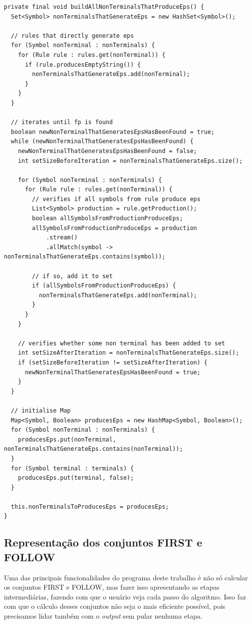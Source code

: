 \documentclass[11pt]{article}
\begin{document}
\begin{verbatim}
private final void buildAllNonTerminalsThatProduceEps() {
  Set<Symbol> nonTerminalsThatGenerateEps = new HashSet<Symbol>();

  // rules that directly generate eps
  for (Symbol nonTerminal : nonTerminals) {
    for (Rule rule : rules.get(nonTerminal)) {
      if (rule.producesEmptyString()) {
        nonTerminalsThatGenerateEps.add(nonTerminal);
      }
    }
  }

  // iterates until fp is found
  boolean newNonTerminalThatGeneratesEpsHasBeenFound = true;
  while (newNonTerminalThatGeneratesEpsHasBeenFound) {
    newNonTerminalThatGeneratesEpsHasBeenFound = false;
    int setSizeBeforeIteration = nonTerminalsThatGenerateEps.size();

    for (Symbol nonTerminal : nonTerminals) {
      for (Rule rule : rules.get(nonTerminal)) {
        // verifies if all symbols from rule produce eps
        List<Symbol> production = rule.getProduction();
        boolean allSymbolsFromProductionProduceEps;
        allSymbolsFromProductionProduceEps = production
            .stream()
            .allMatch(symbol -> nonTerminalsThatGenerateEps.contains(symbol));

        // if so, add it to set
        if (allSymbolsFromProductionProduceEps) {
          nonTerminalsThatGenerateEps.add(nonTerminal);
        }
      }
    }

    // verifies whether some non terminal has been added to set
    int setSizeAfterIteration = nonTerminalsThatGenerateEps.size();
    if (setSizeBeforeIteration != setSizeAfterIteration) {
      newNonTerminalThatGeneratesEpsHasBeenFound = true;
    }
  }

  // initialise Map
  Map<Symbol, Boolean> producesEps = new HashMap<Symbol, Boolean>();
  for (Symbol nonTerminal : nonTerminals) {
    producesEps.put(nonTerminal, nonTerminalsThatGenerateEps.contains(nonTerminal));
  }
  for (Symbol terminal : terminals) {
    producesEps.put(terminal, false);
  }

  this.nonTerminalsToProducesEps = producesEps;
}
\end{verbatim}

\subsection{Representação dos conjuntos FIRST e FOLLOW}
\label{sec:orgheadline5}
Uma das principais funcionalidades do programa deste trabalho é não só calcular
os conjuntos FIRST e FOLLOW, mas fazer isso apresentando as etapas
intermediárias, fazendo com que o usuário veja cada passo do algoritmo. Isso faz
com que o cálculo desses conjuntos não seja o mais eficiente possível, pois
precisamos lidar também com o \emph{output} sem pular nenhuma etapa.
\end{document}

